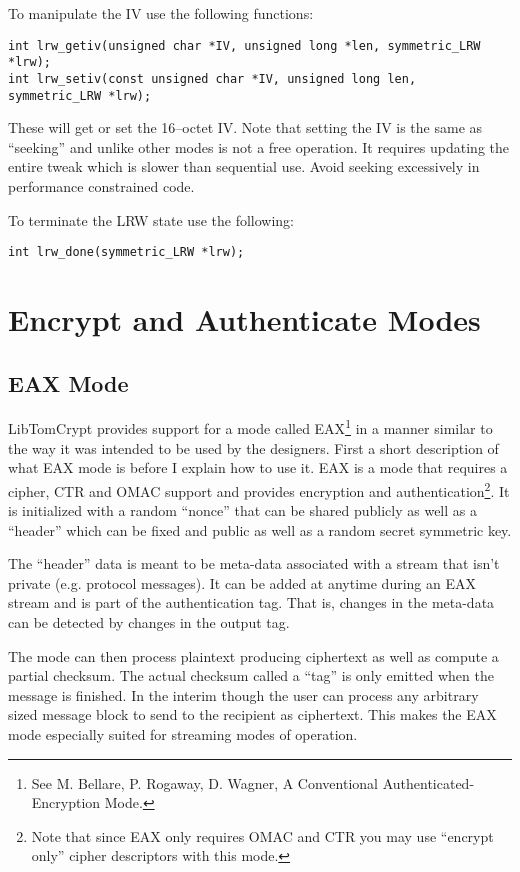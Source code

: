 \documentclass[a4paper]{book}
\begin{document}
To manipulate the IV use the following functions:

  
\begin{verbatim}
int lrw_getiv(unsigned char *IV, unsigned long *len, symmetric_LRW *lrw);
int lrw_setiv(const unsigned char *IV, unsigned long len, symmetric_LRW *lrw);
\end{verbatim}

These will get or set the 16--octet IV.  Note that setting the IV is the same as ``seeking'' and unlike other modes is not a free operation.  It requires
updating the entire tweak which is slower than sequential use.  Avoid seeking excessively in performance constrained code.

To terminate the LRW state use the following:

\begin{verbatim}
int lrw_done(symmetric_LRW *lrw);
\end{verbatim}

\section{Encrypt and Authenticate Modes}

\subsection{EAX Mode}
LibTomCrypt provides support for a mode called EAX\footnote{See 
M. Bellare, P. Rogaway, D. Wagner, A Conventional Authenticated-Encryption Mode.} in a manner similar to the
way it was intended to be used by the designers.  First a short description of what EAX mode is before I explain how to use it.  
EAX is a mode that requires a cipher, CTR and OMAC support and provides encryption and authentication\footnote{Note that since EAX only requires OMAC and CTR you may use ``encrypt only'' cipher descriptors with this mode.}.  
It is initialized with a random ``nonce'' that can be shared publicly as well as a ``header'' which can be fixed and public as well as a random 
secret symmetric key.

The ``header'' data is meant to be meta-data associated with a stream that isn't private (e.g. protocol messages).  It can
be added at anytime during an EAX stream and is part of the authentication tag.  That is, changes in the meta-data can
be detected by changes in the output tag.

The mode can then process plaintext producing ciphertext as well as compute a partial checksum.  The actual checksum
called a ``tag'' is only emitted when the message is finished.  In the interim though the user can process any arbitrary
sized message block to send to the recipient as ciphertext.  This makes the EAX mode especially suited for streaming modes
of operation.
\end{document}
